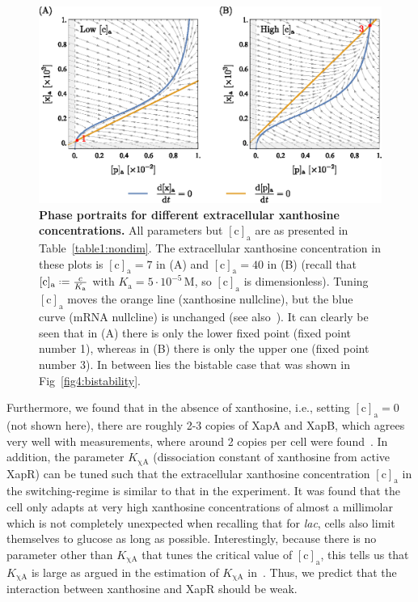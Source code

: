 \documentclass[10pt,letterpaper]{article}
\newcommand{\unit}[1]{\,\mathrm{#1}}
\newcommand{\n}[1]{\mathrm{#1}}
\newcommand*{\defeq}{\mathrel{\vcenter{\baselineskip0.5ex \lineskiplimit0pt
			\hbox{\scriptsize.}\hbox{\scriptsize.}}}%
	=}
\begin{document}
	\begin{figure}%
		\centering
		\includegraphics{media/Fig5_extraxanth.eps}
		\caption{{\bf Phase portraits for different extracellular xanthosine concentrations.}
			All parameters but $\n{[c]_a}$ are as presented in
			Table~\ref{table1:nondim}. The extracellular xanthosine
			concentration in these plots is $\n{[c]_a}=7$ in (A) and
			$\n{[c]_a}= 40$ in (B) (recall that $\n{[c]_{a}} \defeq
			\frac{c}{K_{\n{a}}}$ with $K_{\n{a}} = 5 \cdot 10^{-5} \unit{M}$,
			so $\n{[c]_a}$ is dimensionless).
			Tuning $\n{[c]_a}$ moves the orange line (xanthosine nullcline), but the blue curve (mRNA nullcline) is unchanged (see
			also~). It can clearly be seen that in (A) there is
			only the lower fixed point (fixed point number 1), whereas in (B)
			there is only the upper one (fixed point number 3). In between lies
			the bistable case that was shown in Fig~\ref{fig4:bistability}.}
		\label{fig5:extraxanth}
	\end{figure}
	
	Furthermore, we found that in the absence of xanthosine, i.e., setting
	$\n{[c]_a}=0$ (not shown here), there are roughly 2-3 copies of XapA and XapB, which agrees very
	well with measurements, where around 2 copies per cell were
	found~\cite{Li2014}. In addition, the parameter $K_{\n{\chi A}}$
	(dissociation constant of xanthosine from active XapR) can be tuned such
	that the extracellular xanthosine concentration $\n{[c]_a}$ in the
	switching-regime is similar to that in the experiment. It was found that the
	cell only adapts at very high xanthosine concentrations of almost a
	millimolar~\cite{Norholm2001} which is not completely unexpected when
	recalling that for \emph{lac}, cells also limit themselves to glucose as
	long as possible. Interestingly, because there is no parameter other than
	$K_{\n{\chi A}}$ that tunes the critical value of $\n{[c]_a}$, this tells us
	that $K_{\n{\chi A}}$ is large as argued in the estimation of $K_{\n{\chi
			A}}$ in~. Thus, we predict that the interaction between xanthosine and XapR
	should be weak.
	
\end{document}
